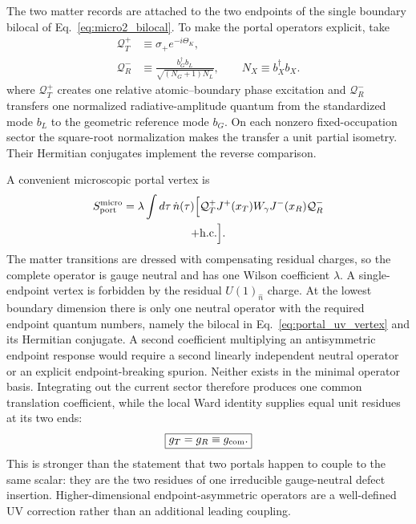 \documentclass[aps,prd,twocolumn,10pt,superscriptaddress,nofootinbib]{revtex4-2}
\begin{document}
The two matter records are attached to the two endpoints of the single
boundary bilocal of Eq.~\eqref{eq:micro2_bilocal}.  To make the portal
operators explicit, take
\begin{equation}
\begin{aligned}
 \mathcal Q_T^+&\equiv \sigma_+e^{-i\Theta_K},\\
 \mathcal Q_R^-&\equiv
 \frac{b_G^\dagger b_L}{\sqrt{(N_G+1)N_L}},
 \qquad N_X\equiv b_X^\dagger b_X.
\end{aligned}
 \label{eq:portal_matter_transition_ops}
\end{equation}
where $\mathcal Q_T^+$ creates one relative atomic--boundary phase
excitation and $\mathcal Q_R^-$ transfers one normalized radiative-amplitude
quantum from the standardized mode $b_L$ to the geometric reference mode
$b_G$.  On each nonzero fixed-occupation sector the square-root
normalization makes the transfer a unit partial isometry.  Their Hermitian
conjugates implement the reverse comparison.

A convenient microscopic portal vertex is
\begin{multline}
 S_{\rm port}^{\rm micro}=\lambda\int d\tau\,\dot n(\tau)
 \Big[
 \mathcal Q_T^+J^+(x_T)W_\gamma J^-(x_R)\mathcal Q_R^-\\
 +{\rm h.c.}\Big].
 \label{eq:portal_uv_vertex}
\end{multline}
The matter transitions are dressed with compensating residual charges, so
the complete operator is gauge neutral and has one Wilson coefficient
$\lambda$.  A single-endpoint vertex is forbidden by the residual
$U(1)_{\hat n}$ charge.  At the lowest boundary dimension there is only one
neutral operator with the required endpoint quantum numbers, namely the
bilocal in Eq.~\eqref{eq:portal_uv_vertex} and its Hermitian conjugate.  A
second coefficient multiplying an antisymmetric endpoint response would
require a second linearly independent neutral operator or an explicit
endpoint-breaking spurion.  Neither exists in the minimal operator basis.
Integrating out the current sector therefore produces one common
translation coefficient, while the local Ward identity supplies equal
unit residues at its two ends:
\begin{equation}
 \boxed{g_T=g_R\equiv g_{\rm com}.}
 \label{eq:portal_common_gate_proved}
\end{equation}
This is stronger than the statement that two portals happen to couple to the
same scalar: they are the two residues of one irreducible gauge-neutral
defect insertion.  Higher-dimensional endpoint-asymmetric operators are a
well-defined UV correction rather than an additional leading coupling.
\end{document}
